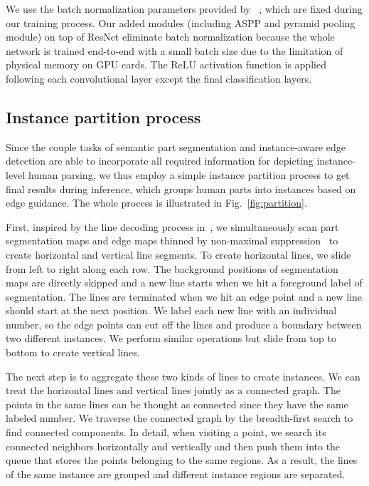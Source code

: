 \documentclass[runningheads]{llncs}
\begin{document}
We use the batch normalization parameters provided by ~\cite{chen2016deeplab}, which are fixed during our training process. Our added modules (including ASPP and pyramid pooling module) on top of ResNet eliminate batch normalization because the whole network is trained end-to-end with a small batch size due to the limitation of physical memory on GPU cards. The ReLU activation function is applied following each convolutional layer except the final classification layers.




\subsection{Instance partition process}

Since the couple tasks of semantic part segmentation and instance-aware edge detection are able to incorporate all required information for depicting instance-level human parsing, we thus employ a simple instance partition process to get final results during inference, which groups human parts into instances based on edge guidance. The whole process is illustrated in Fig.~\ref{fig:partition}.

First, inspired by the line decoding process in~\cite{Liu_2017_ICCV}, we simultaneously scan part segmentation maps and edge maps thinned by non-maximal suppression~\cite{xie2015holistically} to create horizontal and vertical line segments. To create horizontal lines, we slide from left to right along each row. The background positions of segmentation maps are directly skipped and a new line starts when we hit a foreground label of segmentation. The lines are terminated when we hit an edge point and a new line should start at the next position.
We label each new line with an individual number, so the edge points can cut off the lines and produce a boundary between two different instances. We perform similar operations but slide from top to bottom to create vertical lines.

The next step is to aggregate these two kinds of lines to create instances. We can treat the horizontal lines and vertical lines jointly as a connected graph. The points in the same lines can be thought as connected since they have the same labeled number. We traverse the connected graph by the breadth-first search to find connected components. In detail, when visiting a point, we search its connected neighbors horizontally and vertically and then push them into the queue that stores the points belonging to the same regions. As a result, the lines of the same instance are grouped and different instance regions are separated.
\end{document}

